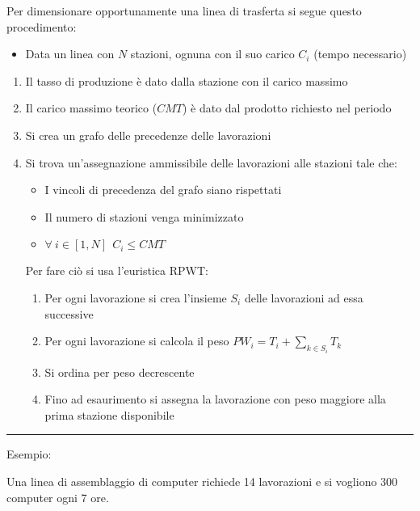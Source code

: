 \documentclass{article}
\begin{document}
\noindent Per dimensionare opportunamente una linea di trasferta si segue questo procedimento:
\begin{itemize}
    \item Data un linea con $N$ stazioni, ognuna con il suo carico $C_i$ (tempo necessario)
\end{itemize}
\begin{enumerate}
    \item Il tasso di produzione è dato dalla stazione con il carico massimo
    \item Il carico massimo teorico ($CMT$) è dato dal prodotto richiesto nel periodo
    \item Si crea un grafo delle precedenze delle lavorazioni
    \item Si trova un'assegnazione ammissibile delle lavorazioni alle stazioni tale che:
        \begin{itemize}
            \item I vincoli di precedenza del grafo siano rispettati
            \item Il numero di stazioni venga minimizzato
            \item $\forall\ i\in[1,N]\ \ C_i\leq CMT$\newline
        \end{itemize}

        Per fare ciò si usa l'euristica RPWT:
            \begin{enumerate}
                \item Per ogni lavorazione si crea l'insieme $S_i$ delle lavorazioni ad essa successive
                \item Per ogni lavorazione si calcola il peso $PW_i=T_i+\sum_{k\in S_i} T_k$
                \item Si ordina per peso decrescente
                \item Fino ad esaurimento si assegna la lavorazione con peso maggiore alla prima stazione disponibile
            \end{enumerate}
        
\end{enumerate}

\noindent\rule{\textwidth}{0.5pt}

\noindent Esempio:\newline

\noindent Una linea di assemblaggio di computer richiede 14 lavorazioni e si vogliono 300 computer ogni 7 ore.

\newpage
\end{document}
